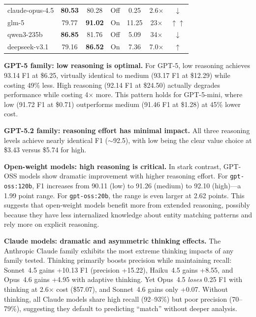 \documentclass[runningheads]{llncs}
\begin{document}
\begin{table}[htbp]
\begin{tabular}{lccccccc}
claude-opus-4.5   & \textbf{80.53} & \multicolumn{2}{c}{80.28} & Off & 0.25 & 2.6$\times$ & $\downarrow$ \\
glm-5        & 79.77 & \multicolumn{2}{c}{\textbf{91.02}} & On & 11.25 & 23$\times$ & $\uparrow\uparrow$ \\
qwen3-235b   & \textbf{86.85} & \multicolumn{2}{c}{81.76} & Off & 5.09 & 34$\times$ & $\downarrow$ \\
deepseek-v3.1 & 79.16 & \multicolumn{2}{c}{\textbf{86.52}} & On & 7.36 & 7.0$\times$ & $\uparrow$ \\
\bottomrule
\end{tabular}
\end{table}

\textbf{GPT-5 family: low reasoning is optimal.} For GPT-5, low reasoning achieves 93.14 F1 at \$6.25, virtually identical to medium (93.17 F1 at \$12.29) while costing 49\% less. High reasoning (92.14 F1 at \$24.50) actually degrades performance while costing 4$\times$ more. This pattern holds for GPT-5-mini, where low (91.72 F1 at \$0.71) outperforms medium (91.46 F1 at \$1.28) at 45\% lower cost.

\textbf{GPT-5.2 family: reasoning effort has minimal impact.} All three reasoning levels achieve nearly identical F1 ($\sim$92.5), with low being the clear value choice at \$3.43 versus \$5.74 for high.

\textbf{Open-weight models: high reasoning is critical.} In stark contrast, GPT-OSS models show dramatic improvement with higher reasoning effort. For \texttt{gpt-oss:120b}, F1 increases from 90.11 (low) to 91.26 (medium) to 92.10 (high)---a 1.99 point range. For \texttt{gpt-oss:20b}, the range is even larger at 2.62 points. This suggests that open-weight models benefit more from extended reasoning, possibly because they have less internalized knowledge about entity matching patterns and rely more on explicit reasoning.

\textbf{Claude models: dramatic and asymmetric thinking effects.} The Anthropic Claude family exhibits the most extreme thinking impacts of any family tested. Thinking primarily boosts precision while maintaining recall: Sonnet~4.5 gains +10.13 F1 (precision +15.22), Haiku~4.5 gains +8.55, and Opus~4.6 gains +4.95 with adaptive thinking.  Yet Opus~4.5 \emph{loses} 0.25 F1 with thinking at 2.6$\times$ cost (\$57.07), and Sonnet~4.6 gains only +0.07.  Without thinking, all Claude models share high recall (92--93\%) but poor precision (70--79\%), suggesting they default to predicting ``match'' without deeper analysis.
\end{document}
